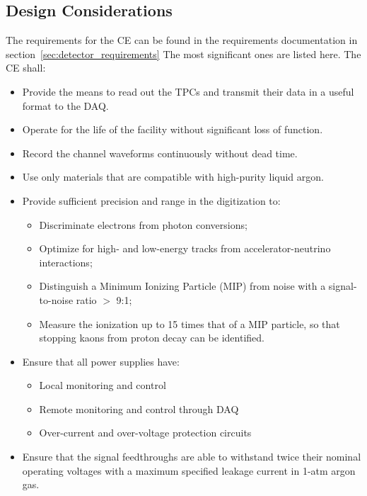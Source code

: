 %
\subsection{Design Considerations} 
\label{subsec:ce_reqs_n_specs}

The requirements for the CE can be found in the requirements documentation in section~\ref{sec:detector_requirements}
The most significant ones are listed here. The CE shall:

\begin{itemize}	
\item Provide the means to read out the TPCs and transmit their data in a useful format to the DAQ.
\item Operate for the life of the facility without significant loss of function.
\item Record the channel waveforms continuously without dead time.
\item Use only materials that are compatible with high-purity liquid argon.
\item Provide sufficient precision and range in the digitization to:
\begin{itemize}
\item Discriminate electrons from photon conversions;
\item Optimize for high- and low-energy tracks from accelerator-neutrino interactions;
\item Distinguish a Minimum Ionizing Particle (MIP) from noise with a signal-to-noise ratio $>$ 9:1;
\item Measure the ionization up to 15 times that of a MIP particle, so that stopping kaons from proton decay can be identified.
\end{itemize}
\item Ensure that all power supplies have: 
\begin{itemize}
\item Local monitoring and control
\item Remote monitoring and control through DAQ
\item Over-current and over-voltage protection circuits
\end{itemize}
\item Ensure that the signal feedthroughs are able to withstand twice their nominal operating voltages 
with a maximum specified leakage current in 1-atm argon gas.
\end{itemize}


